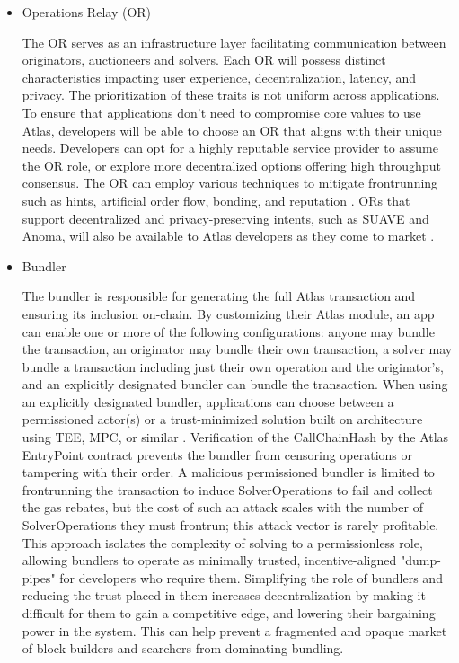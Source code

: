 \documentclass{article}
\begin{document}
\begin{itemize}
\item Operations Relay (OR)

The OR serves as an infrastructure layer facilitating communication between originators, auctioneers and solvers. Each OR will possess distinct characteristics impacting user experience, decentralization, latency, and privacy. The prioritization of these traits is not uniform across applications. To ensure that applications don’t need to compromise core values to use Atlas, developers will be able to choose an OR that aligns with their unique needs. Developers can opt for a highly reputable service provider to assume the OR role, or explore more decentralized options offering high throughput consensus. The OR can employ various techniques to mitigate frontrunning such as hints, artificial order flow, bonding, and reputation \cite{share} \cite{bond}. ORs that support decentralized and privacy-preserving intents, such as SUAVE and Anoma, will also be available to Atlas developers as they come to market \cite{suave} \cite{anoma}. 

\item Bundler

The bundler is responsible for generating the full Atlas transaction and ensuring its inclusion on-chain. By customizing their Atlas module, an app can enable one or more of the following configurations: anyone may bundle the transaction, an originator may bundle their own transaction, a solver may bundle a transaction including just their own operation and the originator’s, and an explicitly designated bundler can bundle the transaction. When using an explicitly designated bundler, applications can choose between a permissioned actor(s) or a trust-minimized solution built on architecture using TEE, MPC, or similar  \cite{lit}. Verification of the CallChainHash by the Atlas EntryPoint contract prevents the bundler from censoring operations or tampering with their order. A malicious permissioned bundler is limited to frontrunning the transaction to induce SolverOperations to fail and collect the gas rebates, but the cost of such an attack scales with the number of SolverOperations they must frontrun; this attack vector is rarely profitable. This approach isolates the complexity of solving to a permissionless role, allowing bundlers to operate as minimally trusted, incentive-aligned "dump-pipes" for developers who require them. Simplifying the role of bundlers and reducing the trust placed in them increases decentralization by making it difficult for them to gain a competitive edge, and lowering their bargaining power in the system. This can help prevent a fragmented and opaque market of block builders and searchers from dominating bundling.


\end{itemize}
\end{document}
